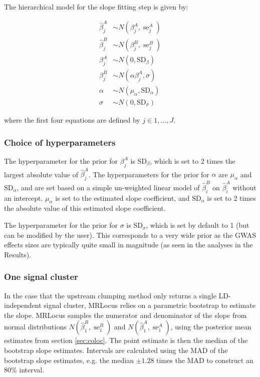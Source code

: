 \documentclass[11pt]{article}
\DeclareMathOperator{\se}{\textrm{se}}
\begin{document}
The hierarchical model for the slope fitting step is given by:

\begin{align}
  \widehat{\beta}_j^A &\sim N(\beta_j^A, \se_j^A) \\
  \widehat{\beta}_j^B &\sim N(\beta_j^B, \se_j^B) \\
  \beta_j^A &\sim N(0, \textrm{SD}_\beta) \\
  \beta_j^B &\sim N(\alpha \beta_j^A, \sigma) \\
  \alpha &\sim N(\mu_\alpha, \textrm{SD}_\alpha) \\
  \sigma &\sim N(0, \textrm{SD}_\sigma)
\end{align}

where the first four equations are defined by $j \in 1,\dots,J$.

\subsubsection{Choice of hyperparameters}

The hyperparameter for the prior for $\beta_j^A$ is
$\textrm{SD}_\beta$, which is set to 2 times the largest absolute value
of $\widehat{\beta}_j^A$.
The hyperparameters for the prior for $\alpha$ are
$\mu_\alpha$ and $\textrm{SD}_\alpha$, and 
are set based on a simple un-weighted linear model of
$\widehat{\beta}_i^B$ on $\widehat{\beta}_i^A$ without an intercept.
$\mu_\alpha$ is set to the estimated slope coefficient, and
$\textrm{SD}_\alpha$ is set to 2 times the absolute value of this
estimated slope coefficient.

The hyperparameter for the prior for $\sigma$ is
$\textrm{SD}_\sigma$, which is set by default to
1 (but can be modified by the user). This corresponds to a very wide
prior as the GWAS effects sizes are typically quite small in magnitude
(as seen in the analyses in the Results).

\subsubsection{One signal cluster}

In the case that the upstream clumping method only returns a single
LD-independent signal cluster, MRLocus relies on a parametric
bootstrap to estimate the slope. MRLocus samples the numerator and
denominator of the slope from normal distributions 
$N(\widehat{\beta}_1^B,\se_1^B)$ and $N(\widehat{\beta}_1^A, \se_1^A)$,
using the posterior mean estimates from section \ref{sec:coloc}.
The point estimate is then the median of the bootstrap slope
estimates. Intervals are calculated using the MAD of the bootstrap
slope estimates, e.g. the median $\pm 1.28$ times the MAD to construct
an 80\% interval.
\end{document}
